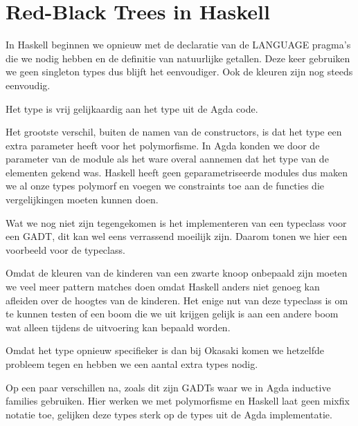 \section{Red-Black Trees in Haskell}

In Haskell beginnen we opnieuw met de declaratie van de LANGUAGE pragma's die
we nodig hebben en de definitie van natuurlijke getallen. Deze keer gebruiken
we geen singleton types dus blijft het eenvoudiger. Ook de kleuren zijn nog
steeds eenvoudig.


Het  type is vrij gelijkaardig aan het  type uit de
Agda code.


Het grootste verschil, buiten de namen van de constructors, is dat het
 type een extra parameter heeft voor het polymorfisme. In Agda
konden we door de parameter van de module als het ware overal aannemen dat het
type van de elementen gekend was. Haskell heeft geen geparametriseerde modules
dus maken we al onze types polymorf en voegen we constraints toe aan de
functies die vergelijkingen moeten kunnen doen.

Wat we nog niet zijn tegengekomen is het implementeren van een typeclass voor
een GADT, dit kan wel eens verrassend moeilijk zijn. Daarom tonen we hier een
voorbeeld voor de  typeclass.


Omdat de kleuren van de kinderen van een zwarte knoop onbepaald zijn moeten we
veel meer pattern matches doen omdat Haskell anders niet genoeg kan afleiden
over de hoogtes van de kinderen. Het enige nut van deze typeclass is om te
kunnen testen of een boom die we uit  krijgen gelijk is aan een
andere boom wat alleen tijdens de uitvoering kan bepaald worden.

Omdat het  type opnieuw specifieker is dan bij Okasaki komen we
hetzelfde probleem tegen en hebben we een aantal extra types nodig.


Op een paar verschillen na, zoals dit zijn GADTs waar we in Agda inductive
families gebruiken. Hier werken we met polymorfisme en Haskell laat geen mixfix
notatie toe, gelijken deze types sterk op de types uit de Agda implementatie.

